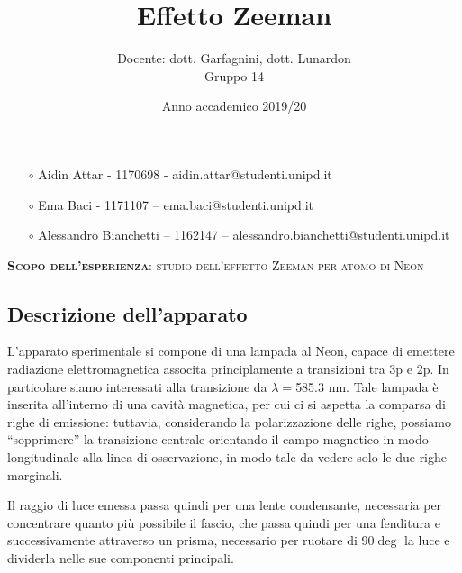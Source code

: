 \documentclass{article}
\title{Effetto Zeeman}
\author{Docente: dott. Garfagnini, dott. Lunardon \\
Gruppo 14}
\date{Anno accademico 2019/20}
\begin{document}
\maketitle

    \begin{itemize}
        \item[$\circ$] Aidin Attar - 1170698 - aidin.attar@studenti.unipd.it
        \item[$\circ$] Ema Baci - 1171107 – ema.baci@studenti.unipd.it
        \item[$\circ$] Alessandro Bianchetti – 1162147 – alessandro.bianchetti@studenti.unipd.it
    \end{itemize}

\vspace{3 cm}
\begin{large}\textsc{\textbf{Scopo dell'esperienza}: studio dell'effetto Zeeman per atomo di Neon} 
\end{large}
\vspace{8.5cm}



\twocolumn

\subsection*{Descrizione dell'apparato} 

L'apparato sperimentale si compone di una lampada al Neon, capace di emettere
radiazione elettromagnetica associta principlamente a transizioni tra 3p e 2p.
In particolare siamo interessati alla transizione da $\lambda = $585.3 nm.
Tale lampada è inserita all'interno di una cavità magnetica, per cui ci si 
aspetta la comparsa di righe di emissione: tuttavia, considerando la 
polarizzazione delle righe, possiamo “sopprimere” la transizione centrale
orientando il campo magnetico in modo longitudinale alla linea di 
osservazione, in modo tale da vedere solo le due righe marginali. 

Il raggio di luce emessa passa quindi per una lente condensante, necessaria 
per concentrare quanto più possibile il fascio, che passa quindi per una 
fenditura e successivamente attraverso un prisma, necessario per ruotare di 
$90\deg$ la luce e dividerla nelle sue componenti principali. 
\end{document}
